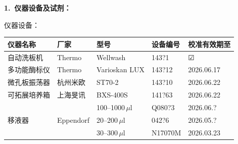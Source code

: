\documentclass[UTF8,10pt,a4paper,fontset=fandol]{ctexart}
\newcommand{\fieldvalue}[1]{#1}
\newcommand{\handwritten}[1]{#1}
\newcommand{\checkboxfield}[1]{\ifstrequal{#1}{checked}{☑}{\ifstrequal{#1}{unclear}{?}{☐}}}
\begin{document}
\medskip
\textbf{1.\ 仪器设备及试剂：}

\quad 仪器设备：

\begin{tabular}{|p{2.7cm}|p{2.3cm}|p{3.0cm}|p{3.0cm}|p{3.0cm}|}
\hline
仪器名称 & 厂家 & 型号 & 设备编号 & 校准有效期至 \\ \hline
自动洗板机 & Thermo & Wellwash &
\fieldvalue{\handwritten{143?1}} &
\fieldvalue{\checkboxfield{checked}}
\\ \hline
多功能酶标仪 & Thermo & Varioskan LUX &
\fieldvalue{\handwritten{143?12}} &
\fieldvalue{\handwritten{2026.06.17}}
\\ \hline
微孔板振荡器 & 杭州米欧 & ST70-2 &
\fieldvalue{\handwritten{143?10}} &
\fieldvalue{\handwritten{2026.06.22}}
\\ \hline
可拓展培养箱 & 上海旻讯 & BXS-400S &
\fieldvalue{\handwritten{141?63}} &
\fieldvalue{\handwritten{2026.06.22}}
\\ \hline
\multirow{3}{*}{移液器} & \multirow{3}{*}{Eppendorf} &
\fieldvalue{\handwritten{100--1000\,$\mu$l}} &
\fieldvalue{\handwritten{Q080?3}} &
\fieldvalue{\handwritten{2026.06.?}}
\\ \cline{3-5}
& &
\fieldvalue{\handwritten{20--200\,$\mu$l}} &
\fieldvalue{\handwritten{042?6}} &
\fieldvalue{\handwritten{2026.05.?}}
\\ \cline{3-5}
& &
\fieldvalue{\handwritten{30--300\,$\mu$l}} &
\fieldvalue{\handwritten{N17070M}} &
\fieldvalue{\handwritten{2026.03.23}}
\\ \hline
\end{tabular}
\end{document}
